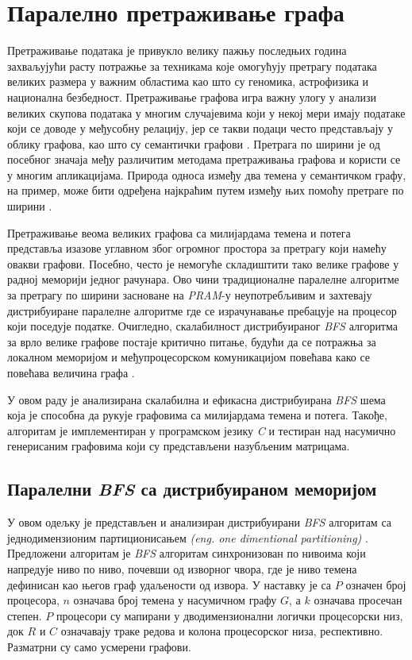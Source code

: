 \chapter{Паралелно претраживање графа}
Претраживање података је привукло велику пажњу последњих година захваљујући расту потражње за техникама које омогућују претрагу података великих размера у важним областима као што су геномика, астрофизика и национална безбедност. Претраживање графова игра важну улогу у анализи великих скупова података у многим случајевима који у некој мери имају податаке који се доводе у међусобну релацију, јер се такви подаци често представљају у облику графова, као што су семантички графови \cite{graph-semantics}. Претрага по ширини је од посебног значаја међу различитим методама претраживања графова и користи се у многим апликацијама. Природа односа између два темена у семантичком графу, на пример, може бити одређена најкраћим путем између њих помоћу претраге по ширини \cite{parallel-graph-traversal}.

\par
Претраживање веома великих графова са милијардама темена и потега представља изазове углавном због огромног простора за претрагу који намећу овакви графови. Посебно, често је немогуће складиштити тако велике графове у радној меморији једног рачунара. Ово чини традиционалне паралелне алгоритме за претрагу по ширини засноване на \textit{PRAM}-у неупотребљивим и захтевају дистрибуиране паралелне алгоритме где се израчунавање пребацује на процесор који поседује податке. Очигледно, скалабилност дистрибуираног \textit{BFS} алгоритма за врло
велике графове постаје критично питање, будући да се потражња за локалном меморијом и међупроцесорском комуникацијом повећава како се повећава величина графа \cite{bfs-dist}. 

\par
У овом раду је анализирана скалабилна и ефикасна дистрибуирана \textit{BFS} шема која је способна да рукује графовима са милијардама темена и потега. Такође, алгоритам је имплементиран у програмском језику \textit{C} и тестиран над насумично генерисаним графовима који су представљени назубљеним матрицама.

\section{Паралелни \textit{BFS} са дистрибуираном меморијом}
У овом одељку је представљен и анализиран дистрибуирани \textit{BFS} алгоритам са једнодимензионим партиционисањем \textit{(eng. one dimentional partitioning)} \cite{bfs-dist}. Предложени алгоритам је \textit{BFS} алгоритам синхронизован по нивоима који напредује ниво по ниво, почевши од изворног чвора, где је ниво темена дефинисан као његов граф удаљености од извора. У наставку је са $P$ означен број процесора, $n$ означава број темена у насумичном графу $G$, а $k$ означава просечан степен. $P$ процесори су мапирани у дводимензионални логички процесорски низ, док $R$ и $C$ означавају траке редова и колона процесорског низа, респективно. Разматрни су само усмерени графови.

